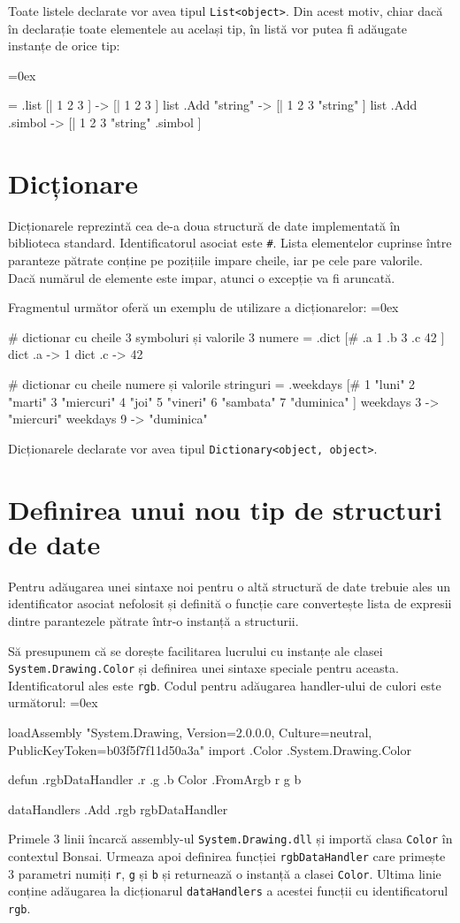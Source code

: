 \documentclass[12pt,a4paper]{memoir}
\renewcommand{\c}{\texttt}
\newenvironment{code}
{
\definecolor{shadecolor}{gray}{0.91}
\topsep=0ex
\relax
\shaded
\verbatim
}
{
\endverbatim
\endshaded
}
\begin{document}
Toate listele declarate vor avea tipul \c{List<object>}. Din acest motiv, chiar dacă în declarație toate elementele au același tip, în listă vor putea fi adăugate instanțe de orice tip:

\begin{code}
= .list [| 1 2 3 ]
  -> [| 1 2 3 ]
list .Add "string"
  -> [| 1 2 3 "string" ]
list .Add .simbol
  -> [| 1 2 3 "string" .simbol ]
\end{code}

\section{Dicționare}

Dicționarele reprezintă cea de-a doua structură de date implementată în biblioteca standard. Identificatorul asociat este \c{\#}. Lista elementelor cuprinse între paranteze pătrate conține pe pozițiile impare cheile, iar pe cele pare valorile. Dacă numărul de elemente este impar, atunci o excepție va fi aruncată.

Fragmentul următor oferă un exemplu de utilizare a dicționarelor:
\begin{code}
# dictionar cu cheile 3 symboluri și valorile 3 numere
= .dict [# .a 1 .b 3 .c 42 ]
dict .a 
  -> 1
dict .c
  -> 42

# dictionar cu cheile numere și valorile stringuri
= .weekdays [#
  1 "luni" 
  2 "marti" 
  3 "miercuri"
  4 "joi"
  5 "vineri"
  6 "sambata"
  7 "duminica"
]
weekdays 3
  -> "miercuri"
weekdays 9
  -> "duminica"
\end{code}

Dicționarele declarate vor avea tipul \c{Dictionary<object, object>}.

\section{Definirea unui nou tip de structuri de date}

Pentru adăugarea unei sintaxe noi pentru o altă structură de date trebuie ales un identificator asociat nefolosit și definită o funcție care convertește lista de expresii dintre parantezele pătrate într-o instanță a structurii.

Să presupunem că se dorește facilitarea lucrului cu instanțe ale clasei \c{System.Drawing.Color} și definirea unei sintaxe speciale pentru aceasta. Identificatorul ales este \c{rgb}. Codul pentru adăugarea handler-ului de culori este următorul:
\newpage
\begin{code}
loadAssembly "System.Drawing, Version=2.0.0.0, Culture=neutral,
    PublicKeyToken=b03f5f7f11d50a3a"
import .Color .System.Drawing.Color

defun .rgbDataHandler .r .g .b {
	Color .FromArgb r g b
}

dataHandlers .Add .rgb rgbDataHandler
\end{code}
Primele 3 linii încarcă assembly-ul \c{System.Drawing.dll} și importă clasa \c{Color} în contextul Bonsai. Urmeaza apoi definirea funcției \c{rgbDataHandler} care primește 3 parametri numiți \c{r}, \c{g} și \c{b} și returnează o instanță a clasei \c{Color}. Ultima linie conține adăugarea la dicționarul \c{dataHandlers} a acestei funcții cu identificatorul \c{rgb}. 
\end{document}
